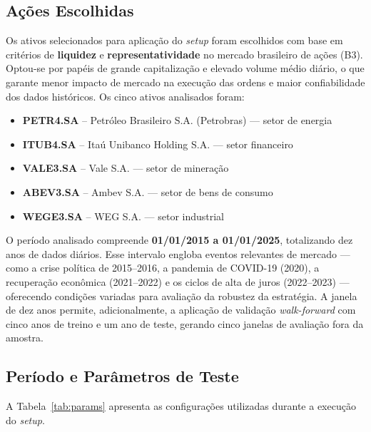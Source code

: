 \documentclass[a4paper,10pt]{article}
\begin{document}
\subsection{Ações Escolhidas}

Os ativos selecionados para aplicação do \textit{setup} foram escolhidos com base em critérios de \textbf{liquidez} e \textbf{representatividade} no mercado brasileiro de ações (B3). Optou-se por papéis de grande capitalização e elevado volume médio diário, o que garante menor impacto de mercado na execução das ordens e maior confiabilidade dos dados históricos. Os cinco ativos analisados foram:

\begin{itemize}
  \item \textbf{PETR4.SA} -- Petróleo Brasileiro S.A. (Petrobras) --- setor de energia
  \item \textbf{ITUB4.SA} -- Itaú Unibanco Holding S.A. --- setor financeiro
  \item \textbf{VALE3.SA} -- Vale S.A. --- setor de mineração
  \item \textbf{ABEV3.SA} -- Ambev S.A. --- setor de bens de consumo
  \item \textbf{WEGE3.SA} -- WEG S.A. --- setor industrial
\end{itemize}

\noindent O período analisado compreende \textbf{01/01/2015 a 01/01/2025}, totalizando dez anos de dados diários. Esse intervalo engloba eventos relevantes de mercado --- como a crise política de 2015--2016, a pandemia de COVID-19 (2020), a recuperação econômica (2021--2022) e os ciclos de alta de juros (2022--2023) --- oferecendo condições variadas para avaliação da robustez da estratégia. A janela de dez anos permite, adicionalmente, a aplicação de validação \textit{walk-forward} com cinco anos de treino e um ano de teste, gerando cinco janelas de avaliação fora da amostra.

\subsection{Período e Parâmetros de Teste}

A Tabela~\ref{tab:params} apresenta as configurações utilizadas durante a execução do \textit{setup}.
\end{document}
